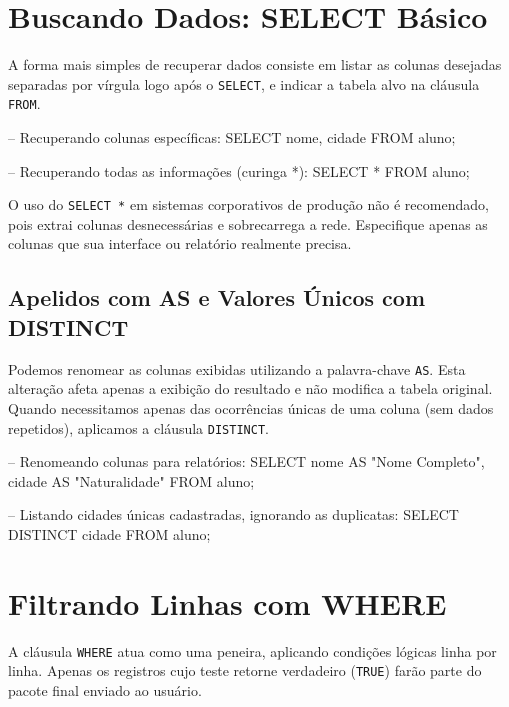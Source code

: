 \section{Buscando Dados: SELECT Básico}

A forma mais simples de recuperar dados consiste em listar as colunas desejadas separadas por vírgula logo após o \texttt{SELECT}, e indicar a tabela alvo na cláusula \texttt{FROM}.

\begin{sqlcode}
-- Recuperando colunas específicas:
SELECT nome, cidade FROM aluno;

-- Recuperando todas as informações (curinga *):
SELECT * FROM aluno;
\end{sqlcode}

\begin{tcolorbox}[colback=blue!5,colframe=blue!40!black,title=Dica de Ouro]
O uso do \texttt{SELECT *} em sistemas corporativos de produção não é recomendado, pois extrai colunas desnecessárias e sobrecarrega a rede. Especifique apenas as colunas que sua interface ou relatório realmente precisa.
\end{tcolorbox}

\subsection{Apelidos com AS e Valores Únicos com DISTINCT}
Podemos renomear as colunas exibidas utilizando a palavra-chave \texttt{AS}. Esta alteração afeta apenas a exibição do resultado e não modifica a tabela original. Quando necessitamos apenas das ocorrências únicas de uma coluna (sem dados repetidos), aplicamos a cláusula \texttt{DISTINCT}.

\begin{sqlcode}
-- Renomeando colunas para relatórios:
SELECT nome AS "Nome Completo", cidade AS "Naturalidade" FROM aluno;

-- Listando cidades únicas cadastradas, ignorando as duplicatas:
SELECT DISTINCT cidade FROM aluno;
\end{sqlcode}

\section{Filtrando Linhas com WHERE}

A cláusula \texttt{WHERE} atua como uma peneira, aplicando condições lógicas linha por linha. Apenas os registros cujo teste retorne verdadeiro (\texttt{TRUE}) farão parte do pacote final enviado ao usuário.

